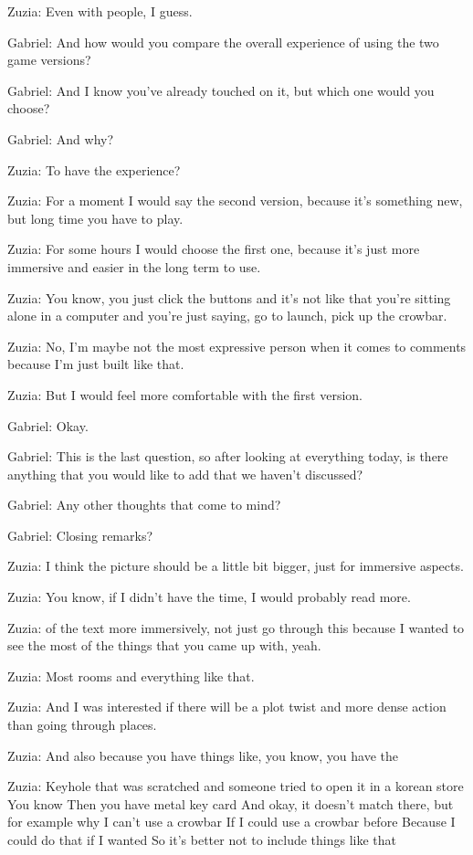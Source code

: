 Zuzia: Even with people, I guess.

Gabriel: And how would you compare the overall experience of using the two game versions?

Gabriel: And I know you've already touched on it, but which one would you choose?

Gabriel: And why?

Zuzia: To have the experience?

Zuzia: For a moment I would say the second version, because it's something new, but long time you have to play.

Zuzia: For some hours I would choose the first one, because it's just more immersive and easier in the long term to use.

Zuzia: You know, you just click the buttons and it's not like that you're sitting alone in a computer and you're just saying, go to launch, pick up the crowbar.

Zuzia: No, I'm maybe not the most expressive person when it comes to comments because I'm just built like that.

Zuzia: But I would feel more comfortable with the first version.

Gabriel: Okay.

Gabriel: This is the last question, so after looking at everything today, is there anything that you would like to add that we haven't discussed?

Gabriel: Any other thoughts that come to mind?

Gabriel: Closing remarks?

Zuzia: I think the picture should be a little bit bigger, just for immersive aspects.

Zuzia: You know, if I didn't have the time, I would probably read more.

Zuzia: of the text more immersively, not just go through this because I wanted to see the most of the things that you came up with, yeah.

Zuzia: Most rooms and everything like that.

Zuzia: And I was interested if there will be a plot twist and more dense action than going through places.

Zuzia: And also because you have things like, you know, you have the

Zuzia: Keyhole that was scratched and someone tried to open it in a korean store You know Then you have metal key card And okay, it doesn't match there, but for example why I can't use a crowbar If I could use a crowbar before Because I could do that if I wanted So it's better not to include things like that

